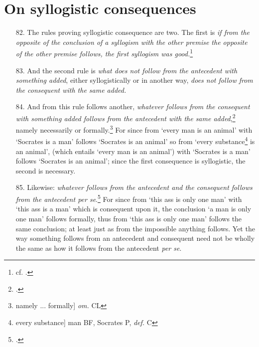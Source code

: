 \section{On syllogistic consequences}
\begin{itemize}
\item[82.] The rules proving syllogistic consequence are two. The first is \textit{if from the opposite of the conclusion of a syllogism with the other premise the opposite of the other premise follows, the first syllogism was good.}\footnote{cf. \cite[p. 65.10]{BurleyDPAL}.}
\item[83.] And the second rule is \textit{what does not follow from the antecedent with something added}, either syllogistically or in another way, \textit{does not follow from the consequent with the same added.}
\item[84.] And from this rule follows another, \textit{whatever follows from the consequent with something added follows from the antecedent with the same added},\footnote{\cite[p. 62.24]{BurleyDPAL}.} namely necessarily or formally.\footnote{namely ... formally] \textit{om.} CL} For since from `every man is an animal' with `Socrates is a man' follows `Socrates is an animal' so from `every substance\footnote{every substance] man BF, Socrates P, \textit{def.} C} is an animal', (which entails `every man is an animal') with `Socrates is a man' follows `Socrates is an animal'; since the first consequence is syllogistic, the second is necessary.
\item[85.] Likewise: \textit{whatever follows from the antecedent and the consequent follows from the antecedent per se}.\footnote{\cite[p. 62.22]{BurleyDPAL}.} For since from `this ass is only one man' with `this ass is a man' which is consequent upon it, the conclusion `a man is only one man' follows formally, thus from `this ass is only one man' follows the same conclusion; at least just as from the impossible anything follows. Yet the way something follows from an antecedent and consequent need not be wholly the same as how it follows from the antecedent \textit{per se}.
\end{itemize}
